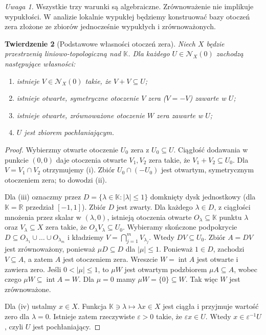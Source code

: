 \documentclass[11pt,a4paper]{article}
\numberwithin{equation}{section}
\theoremstyle{plain}
\newtheorem{twierdzenie}{Twierdzenie}[section]
\theoremstyle{definition}
\theoremstyle{remark}
\newtheorem{uwaga}[twierdzenie]{Uwaga}
\newcommand{\R}{\mathbb R}
\newcommand{\K}{\mathbb K}
\begin{document}
\begin{uwaga}
Wszystkie trzy warunki są algebraiczne. Zrównoważenie nie
implikuje wypukłości. W analizie lokalnie wypukłej będziemy
konstruować bazy otoczeń zera złożone ze zbiorów jednocześnie
wypukłych i zrównoważonych.
\end{uwaga}

\begin{twierdzenie}[Podstawowe własności otoczeń zera]\label{thm:zero-neighborhoods}
Niech $X$ będzie przestrzenią liniowo-topologiczną nad $\K$.
Dla każdego $U\in\mathcal N_X(0)$ zachodzą następujące własności:
\begin{enumerate}[label=\textup{(\roman*)}]
 \item istnieje $V\in\mathcal N_X(0)$ takie, że $V+V\subseteq U$;
 \item istnieje otwarte, symetryczne otoczenie $V$ zera
       ($V=-V$) zawarte w $U$;
 \item istnieje otwarte, zrównoważone otoczenie $W$ zera
       zawarte w $U$;
 \item $U$ jest zbiorem pochłaniającym.
\end{enumerate}
\end{twierdzenie}
\begin{proof}
Wybierzmy otwarte otoczenie $U_0$ zera z $U_0\subseteq U$.
Ciągłość dodawania w punkcie $(0,0)$ daje otoczenia otwarte
$V_1,V_2$ zera takie, że $V_1+V_2\subseteq U_0$.
Dla $V=V_1\cap V_2$ otrzymujemy (i). Zbiór
$U_0\cap(-U_0)$ jest otwartym, symetrycznym otoczeniem zera;
to dowodzi (ii).

Dla (iii) oznaczmy przez $D=\{\lambda\in\K:|\lambda|\leq1\}$
domknięty dysk jednostkowy (dla $\K=\R$ przedział $[-1,1]$).
Zbiór $D$ jest zwarty. Dla każdego $\lambda\in D$, z ciągłości
mnożenia przez skalar w $(\lambda,0)$, istnieją otoczenia otwarte
$O_\lambda\subseteq\K$ punktu $\lambda$ oraz $V_\lambda\subseteq X$
zera takie, że $O_\lambda V_\lambda\subseteq U_0$.
Wybieramy skończone podpokrycie
$D\subseteq O_{\lambda_1}\cup\dots\cup O_{\lambda_m}$ i kładziemy
$V=\bigcap_{j=1}^m V_{\lambda_j}$. Wtedy $DV\subseteq U_0$.
Zbiór $A=DV$ jest zrównoważony, ponieważ $\mu D\subseteq D$
dla $|\mu|\leq1$. Ponieważ $1\in D$, zachodzi $V\subseteq A$,
a zatem $A$ jest otoczeniem zera. Wreszcie $W=\operatorname{int}A$
jest otwarte i zawiera zero. Jeśli $0<|\mu|\leq1$, to
$\mu W$ jest otwartym podzbiorem $\mu A\subseteq A$, wobec czego
$\mu W\subseteq\operatorname{int}A=W$. Dla $\mu=0$ mamy
$\mu W=\{0\}\subseteq W$. Tak więc $W$ jest zrównoważone.

Dla (iv) ustalmy $x\in X$. Funkcja
$\K\ni\lambda\mapsto\lambda x\in X$ jest ciągła i przyjmuje
wartość zero dla $\lambda=0$. Istnieje zatem rzeczywiste
$\varepsilon>0$ takie, że $\varepsilon x\in U$.
Wtedy $x\in\varepsilon^{-1}U$, czyli $U$ jest pochłaniający.
\end{proof}
\end{document}
